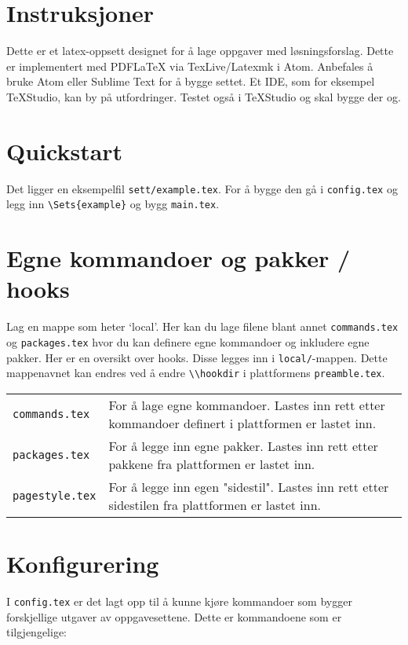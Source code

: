 \documentclass{article}
\def\platformdir{.}
\begin{document}

\lstset{language=[LaTeX]TeX}
\section*{Instruksjoner}
\noindent Dette er et latex-oppsett designet for å lage oppgaver med løsningsforslag. Dette er implementert med PDFLaTeX via TexLive/Latexmk i Atom. Anbefales å bruke Atom eller Sublime Text for å bygge settet. Et IDE, som for eksempel TeXStudio, kan by på utfordringer. Testet også i TeXStudio og skal bygge der og.\\

\section*{Quickstart}
Det ligger en eksempelfil \lstinline{sett/example.tex}. For å bygge den gå i \lstinline{config.tex} og legg inn
\lstinline|\Sets{example}| og bygg \lstinline{main.tex}.

\section*{Egne kommandoer og pakker / hooks}
Lag en mappe som heter `local'. Her kan du lage filene blant annet \lstinline{commands.tex} og \lstinline{packages.tex} hvor du kan definere egne kommandoer og inkludere egne pakker. Her er en oversikt over hooks. Disse legges inn i \lstinline{local/}-mappen. Dette mappenavnet kan endres ved å endre \lstinline{\\hookdir} i plattformens \lstinline{preamble.tex}.\\
\begin{tabularx}{\textwidth}{lX}
	\lstinline{commands.tex} & For å lage egne kommandoer. Lastes inn rett etter kommandoer definert i plattformen er lastet inn.\\
	\lstinline{packages.tex} & For å legge inn egne pakker. Lastes inn rett etter pakkene fra plattformen er lastet inn.\\
	\lstinline{pagestyle.tex} & For å legge inn egen "sidestil". Lastes inn rett etter sidestilen fra plattformen er lastet inn.
\end{tabularx}

\section*{Konfigurering}
I \lstinline|config.tex| er det lagt opp til å kunne kjøre kommandoer som bygger forskjellige utgaver av oppgavesettene.
Dette er kommandoene som er tilgjengelige:\\[2em]
\end{document}
